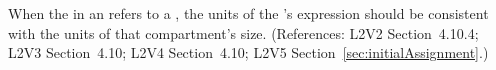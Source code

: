 When the  in an \InitialAssignment refers to a
\Compartment, the units of the \InitialAssignment's  expression
should be consistent with the units of that compartment's size.  (References:
L2V2 Section~4.10.4; L2V3 Section~4.10; L2V4 Section~4.10; L2V5 Section~\ref{sec:initialAssignment}.)
